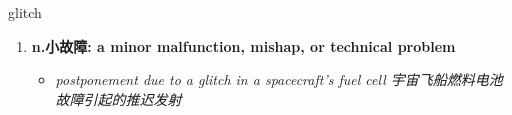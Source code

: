 
\begin{frame}
{\huge glitch}
\begin{center}
\begin{enumerate}\Large
  \item \textbf{n.小故障: a minor malfunction, mishap, or technical problem}
  \begin{itemize}
    \item \em{\Large{postponement due to a glitch in a spacecraft's fuel cell 宇宙飞船燃料电池故障引起的推迟发射}}
  \end{itemize}
\end{enumerate}
\end{center}
\end{frame}
